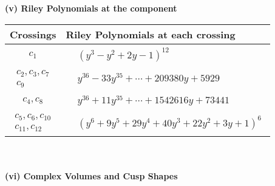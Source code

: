 \documentclass[1p]{elsarticle_modified}
\theoremstyle{definition}
\begin{document}
\newpage\renewcommand{\arraystretch}{1}
\flushleft \textbf{(v) Riley Polynomials at the component}\newline \\
\begin{tabular}{m{50pt}|m{274pt}}
Crossings & \hspace{64pt}Riley Polynomials at each crossing \\
\hline $$\begin{aligned}c_{1}\end{aligned}$$&$\begin{aligned}
&(y^3- y^2+2 y-1)^{12}
\end{aligned}$\\
\hline $$\begin{aligned}c_{2},c_{3},c_{7}\\c_{9}\end{aligned}$$&$\begin{aligned}
&y^{36}-33 y^{35}+\cdots+209380 y+5929
\end{aligned}$\\
\hline $$\begin{aligned}c_{4},c_{8}\end{aligned}$$&$\begin{aligned}
&y^{36}+11 y^{35}+\cdots+1542616 y+73441
\end{aligned}$\\
\hline $$\begin{aligned}c_{5},c_{6},c_{10}\\c_{11},c_{12}\end{aligned}$$&$\begin{aligned}
&(y^6+9 y^5+29 y^4+40 y^3+22 y^2+3 y+1)^6
\end{aligned}$\\
\hline
\end{tabular}\\~\\
\newpage\flushleft \textbf{(vi) Complex Volumes and Cusp Shapes}
\end{document}

